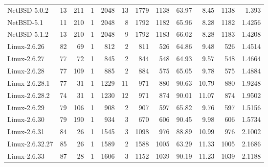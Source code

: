 \documentclass[11pt]{article}
\begin{document}
\begin{center}
\begin{tabular}{lrrrrrrrrrrr}
 NetBSD-5.0.2           &     13  &     211  &                  1  &     2048  &    13  &      1779  &       1138  &    63.97  &     8.45  &    1138  &    1.393  \\
 NetBSD-5.1             &     11  &     210  &                  1  &     2048  &     8  &      1792  &       1182  &    65.96  &     8.28  &    1182  &   1.4256  \\
 NetBSD-5.1.2           &     13  &     210  &                  1  &     2048  &     9  &      1792  &       1183  &    66.02  &     8.28  &    1183  &   1.4208  \\
\hline
\hline
 Linux-2.6.26           &     82  &      69  &                  1  &      812  &     2  &       811  &        526  &    64.86  &     9.48  &     526  &   1.4514  \\
 Linux-2.6.27           &     77  &      72  &                  1  &      845  &     2  &       844  &        548  &    64.93  &     9.57  &     548  &   1.4664  \\
 Linux-2.6.28           &     77  &     109  &                  1  &      885  &     2  &       884  &        575  &    65.05  &     9.78  &     575  &   1.4884  \\
 Linux-2.6.28.1         &     77  &      31  &                  1  &     1229  &    11  &       971  &        880  &    90.63  &    10.79  &     880  &   1.9248  \\
 Linux-2.6.28.2         &     74  &      31  &                  1  &     1230  &    12  &       971  &        874  &    90.01  &    11.07  &     874  &   1.9502  \\
 Linux-2.6.29           &     79  &     106  &                  1  &      908  &     2  &       907  &        597  &    65.82  &     9.76  &     597  &   1.5156  \\
 Linux-2.6.30           &     79  &     190  &                  1  &      934  &     3  &       670  &        606  &    90.45  &     9.98  &     606  &   1.5734  \\
 Linux-2.6.31           &     84  &      26  &                  1  &     1545  &     3  &      1098  &        976  &    88.89  &    10.99  &     976  &   2.1002  \\
 Linux-2.6.32.27        &     85  &      26  &                  1  &     1589  &     2  &      1588  &       1005  &    63.29  &    11.33  &    1005  &   2.1686  \\
 Linux-2.6.33           &     87  &      28  &                  1  &     1606  &     3  &      1152  &       1039  &    90.19  &    11.23  &    1039  &   2.1188  \\

\end{tabular}
\end{center}
\end{document}
